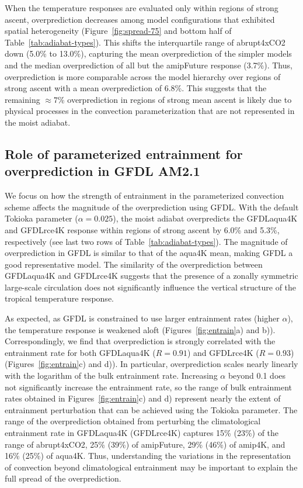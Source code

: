 \documentclass{ametsocV5}
\begin{document}
When the temperature responses are evaluated only within regions of strong ascent, overprediction decreases among model configurations that exhibited spatial heterogeneity (Figure~\ref{fig:spread-75} and bottom half of Table~\ref{tab:adiabat-types}). This shifts the interquartile range of abrupt4xCO2 down (5.0\% to 13.0\%), capturing the mean overprediction of the simpler models and the median overprediction of all but the amipFuture response (3.7\%). Thus, overprediction is more comparable across the model hierarchy over regions of strong ascent with a mean overprediction of 6.8\%. This suggests that the remaining $\approx7$\% overprediction in regions of strong mean ascent is likely due to physical processes in the convection parameterization that are not represented in the moist adiabat.

\subsection{Role of parameterized entrainment for overprediction in GFDL AM2.1}
We focus on how the strength of entrainment in the parameterized convection scheme affects the magnitude of the overprediction using GFDL. With the default Tokioka parameter ($\alpha=0.025$), the moist adiabat overpredicts  the GFDLaqua4K and GFDLrce4K response within regions of strong ascent by 6.0\% and 5.3\%, respectively (see last two rows of Table~\ref{tab:adiabat-types}). The magnitude of overprediction in GFDL is similar to that of the aqua4K mean, making GFDL a good representative model. The similarity of the overprediction between GFDLaqua4K and GFDLrce4K suggests that the presence of a zonally symmetric large-scale circulation does not significantly influence the vertical structure of the tropical temperature response.

As expected, as GFDL is constrained to use larger entrainment rates (higher $\alpha$), the temperature response is weakened aloft (Figures~\ref{fig:entrain}a) and b)). Correspondingly, we find that overprediction is strongly correlated with the entrainment rate for both GFDLaqua4K ($R=0.91$) and GFDLrce4K ($R=0.93$) (Figures~\ref{fig:entrain}c) and d)). In particular, overprediction scales nearly linearly with the logarithm of the bulk entrainment rate. Increasing $\alpha$ beyond 0.1 does not significantly increase the entrainment rate, so the range of bulk entrainment rates obtained in Figures~\ref{fig:entrain}c) and d) represent nearly the extent of entrainment perturbation that can be achieved using the Tokioka parameter. The range of the overprediction obtained from perturbing the climatological entrainment rate in GFDLaqua4K (GFDLrce4K) captures 15\% (23\%) of the range of abrupt4xCO2, 25\% (39\%) of amipFuture, 29\% (46\%) of amip4K, and 16\% (25\%) of aqua4K. Thus, understanding the variations in the representation of convection beyond climatological entrainment may be important to explain the full spread of the overprediction.
\end{document}
